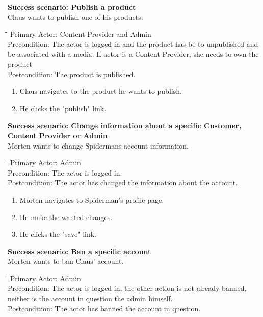 \vspace{3mm}
\textbf{Success scenario: Publish a product} \\
Claus wants to publish one of his products.
\begin{tabbing}
\hspace{5mm}\=\hspace{26mm}\=\kill
\>Primary Actor:\> Content Provider and Admin\\
\>Precondition:\> The actor is logged in and the product has be to unpublished and be associated with a media. If actor is a Content Provider, she needs to own the product\\
\>Postcondition:\> The product is published.
\end{tabbing}
\begin{enumerate} \setlength{\itemsep}{-1mm}
	\item Claus navigates to the product he wants to publish.
	\item He clicks the "publish" link.
\end{enumerate}
\vspace{3mm}
\textbf{Success scenario: Change information about a specific Customer, Content Provider or Admin} \\
Morten wants to change Spidermans account information.
\begin{tabbing}
\hspace{5mm}\=\hspace{26mm}\=\kill
\>Primary Actor:\> Admin\\
\>Precondition:\> The actor is logged in.\\
\>Postcondition:\> The actor has changed the information about the account.
\end{tabbing}
\begin{enumerate} \setlength{\itemsep}{-1mm}
	\item Morten navigates to Spiderman's profile-page.
	\item He make the wanted changes.
	\item He clicks the "save" link.
\end{enumerate}
\vspace{3mm}
\textbf{Success scenario: Ban a specific account} \\
Morten wants to ban Claus' account.
\begin{tabbing}
\hspace{5mm}\=\hspace{26mm}\=\kill
\>Primary Actor:\> Admin\\
\>Precondition:\> The actor is logged in, the other action is not already banned, neither is the account in question the admin himself.\\
\>Postcondition:\> The actor has banned the account in question.
\end{tabbing}
